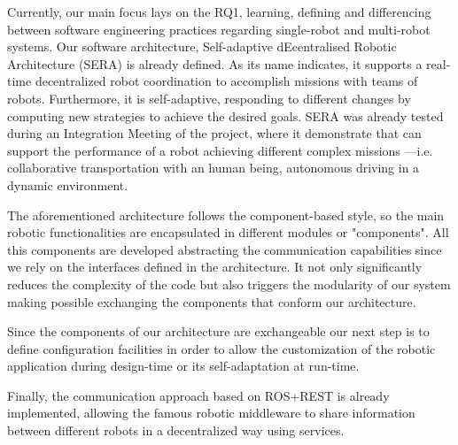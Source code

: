 Currently, our main focus lays on the RQ1, learning, defining and differencing between software engineering practices regarding single-robot and multi-robot systems.
Our software architecture, Self-adaptive dEcentralised Robotic Architecture (SERA) is already defined.
As its name indicates, it supports a real-time decentralized robot coordination to accomplish missions with teams of robots. 
Furthermore, it is self-adaptive, responding to different changes by computing new strategies to achieve the desired goals.
SERA was already tested during an Integration Meeting of the project, where it demonstrate that can support the performance of a robot achieving different complex missions ---i.e. collaborative transportation with an human being, autonomous driving in a dynamic environment.

The aforementioned architecture follows the component-based style, so the main robotic functionalities are encapsulated in different modules or "components".
All this components are developed abstracting the communication capabilities since we rely on the interfaces defined in the architecture.
It not only significantly reduces the complexity of the code but also triggers the modularity of our system making possible exchanging the components that conform our architecture.

Since the components of our architecture are exchangeable our next step is to define configuration facilities in order to allow the customization of the robotic application during design-time or its self-adaptation at run-time.

Finally, the communication approach based on ROS+REST is already implemented, allowing the famous robotic middleware to share information between different robots in a decentralized way using services.

